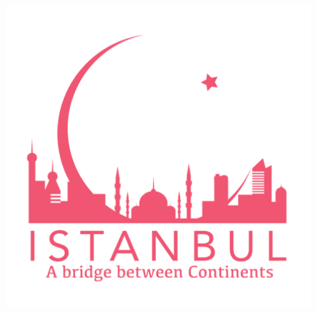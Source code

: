 \documentclass[a0,portrait]{a0poster}
\begin{document}
\begin{multicols}{2}
\begin{center}\vspace{1cm}
\includegraphics[width=30cm,height=25cm]{Quinonez_Julian_Istanbul_Logo.png}
\end{center}\vspace{1cm}


\color{SaddleBrown} %


\end{multicols}
\end{document}
